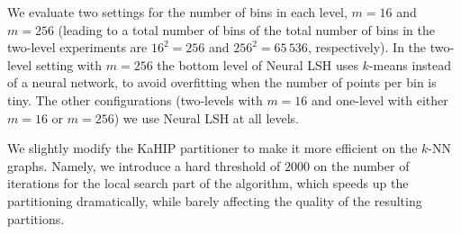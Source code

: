 \documentclass[11pt]{article}
\newcommand{\todoir}[2]{}
\newcommand{\irnote}[1]{\todoir{red}{IR: ``#1''}}
\begin{document}
We evaluate two settings for the number of bins in each level, $m=16$ and $m=256$ (leading to a total number of bins of the total number of bins in the two-level experiments are $16^2=256$ and $256^2 = 65\,536$, respectively).
In the two-level setting with $m=256$ the bottom level of Neural LSH uses $k$-means instead of a neural network, to avoid overfitting when the number of points per bin is tiny. The other configurations (two-levels with $m=16$ and one-level with either $m=16$ or $m=256$) we use Neural LSH at all levels.

We slightly modify the KaHIP partitioner to make it more efficient on the $k$-NN graphs. Namely, we introduce a hard threshold
of $2000$ on the number of iterations for the local search part of the algorithm, which speeds up the partitioning dramatically,
while barely affecting the quality of the resulting partitions.



\end{document}
